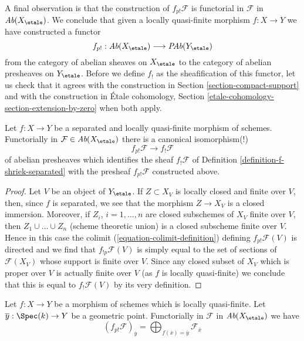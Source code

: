 \medskip\noindent
A final observation is that the construction of $f_{p!}\mathcal{F}$
is functorial in $\mathcal{F}$ in $\textit{Ab}(X_\etale)$.
We conclude that given a locally quasi-finite morphism $f : X \to Y$
we have constructed a functor
$$
f_{p!} :
\textit{Ab}(X_\etale)
\longrightarrow
\textit{PAb}(Y_\etale)
$$
from the category of abelian sheaves on $X_\etale$ to the category
of abelian presheaves on $Y_\etale$. Before we define $f_!$ as the
sheafification of this functor, let us check that it agrees with
the construction in Section \ref{section-compact-support}
and with the construction in
\'Etale cohomology, Section \ref{etale-cohomology-section-extension-by-zero}
when both apply.

\begin{lemma}
\label{lemma-finite-support-f-shriek-separated}
Let $f : X \to Y$ be a separated and locally quasi-finite morphism
of schemes. Functorially in $\mathcal{F} \in \textit{Ab}(X_\etale)$
there is a canonical isomorphism(!)
$$
f_{p!}\mathcal{F} \longrightarrow f_!\mathcal{F}
$$
of abelian presheaves which identifies the sheaf
$f_!\mathcal{F}$ of Definition \ref{definition-f-shriek-separated}
with the presheaf $f_{p!}\mathcal{F}$ constructed above.
\end{lemma}

\begin{proof}
Let $V$ be an object of $Y_\etale$. If $Z \subset X_V$ is locally closed
and finite over $V$, then, since $f$ is separated, we see that
the morphism $Z \to X_V$ is a closed immersion. Moreover, if
$Z_i$, $i = 1, \ldots, n$ are closed subschemes of $X_V$ finite
over $V$, then $Z_1 \cup \ldots \cup Z_n$ (scheme theoretic union)
is a closed subscheme finite over $V$. Hence in this case the colimit
(\ref{equation-colimit-definition}) defining $f_{p!}\mathcal{F}(V)$
is directed and we find that $f_{!p}\mathcal{F}(V)$ is simply equal
to the set of sections of $\mathcal{F}(X_V)$ whose support is finite over $V$.
Since any closed subset of $X_V$ which is proper over $V$ is
actually finite over $V$ (as $f$ is locally quasi-finite)
we conclude that this is equal to $f_!\mathcal{F}(V)$
by its very definition.
\end{proof}

\begin{lemma}
\label{lemma-finite-support-stalk}
Let $f : X \to Y$ be a morphism of schemes which is locally quasi-finite.
Let $\overline{y} : \Spec(k) \to Y$ be a geometric point.
Functorially in $\mathcal{F}$ in $\textit{Ab}(X_\etale)$ we have
$$
(f_{p!}\mathcal{F})_{\overline{y}} =
\bigoplus\nolimits_{f(\overline{x}) = \overline{y}} \mathcal{F}_{\overline{x}}
$$
\end{lemma}

